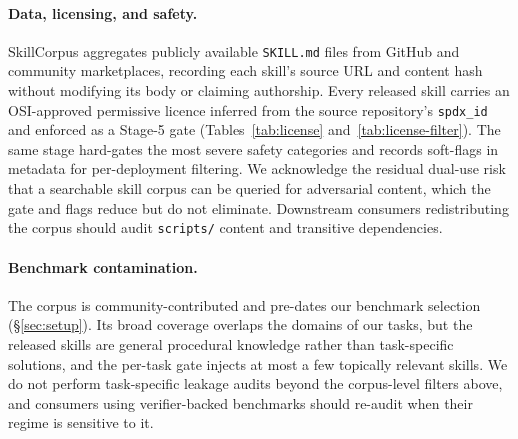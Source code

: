 \else
\paragraph{Data, licensing, and safety.}
SkillCorpus aggregates publicly available \texttt{SKILL.md} files
from GitHub and community marketplaces, recording each skill's
source URL and content hash without modifying its body or claiming
authorship.  Every released skill carries an OSI-approved permissive
licence inferred from the source repository's \texttt{spdx\_id} and
enforced as a Stage-5 gate (Tables~\ref{tab:license}
and~\ref{tab:license-filter}).  The same stage hard-gates the most
severe safety categories and records soft-flags in metadata for
per-deployment filtering.  We acknowledge the residual dual-use risk
that a searchable skill corpus can be queried for adversarial
content, which the gate and flags reduce but do not eliminate.
Downstream consumers redistributing the corpus should audit
\texttt{scripts/} content and transitive dependencies.

\paragraph{Benchmark contamination.}
The corpus is community-contributed and pre-dates our benchmark
selection (\S\ref{sec:setup}).  Its broad coverage overlaps the
domains of our tasks, but the released skills are general procedural
knowledge rather than task-specific solutions, and the per-task gate
injects at most a few topically relevant skills.  We do not perform
task-specific leakage audits beyond the corpus-level filters above,
and consumers using verifier-backed benchmarks should re-audit when
their regime is sensitive to it.
\fi
